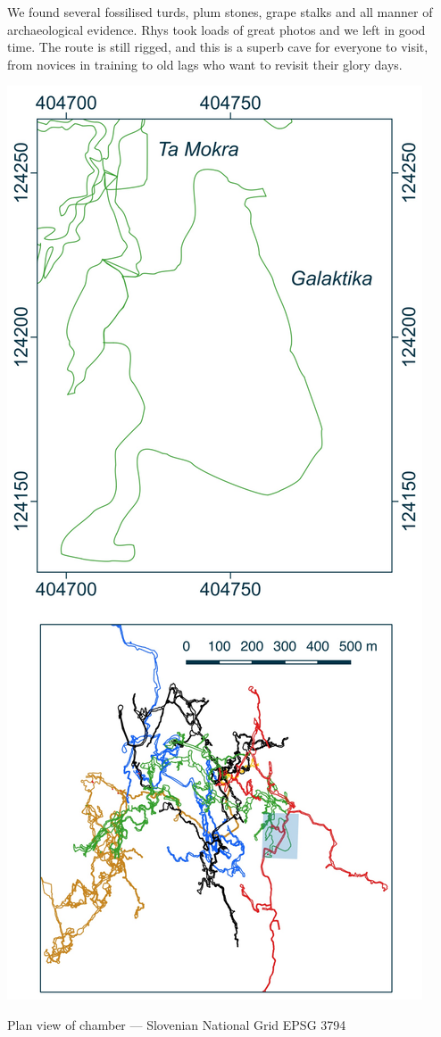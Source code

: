 We found several fossilised turds, plum stones, grape stalks and all manner of archaeological evidence. Rhys took loads of great photos and we left in good time. The route is still rigged, and this is a superb cave for everyone to visit, from novices in training to old lags who want to revisit their glory days.



\begin{marginsurvey}
\includegraphics[width=\linewidth]{images/little_insets/galaktika_inset.pdf}
\label{Ta Mokra}
\caption[Galaktika chamber]{ Plan view of    \protect{} chamber --- Slovenian National Grid EPSG 3794}
\end{marginsurvey}
